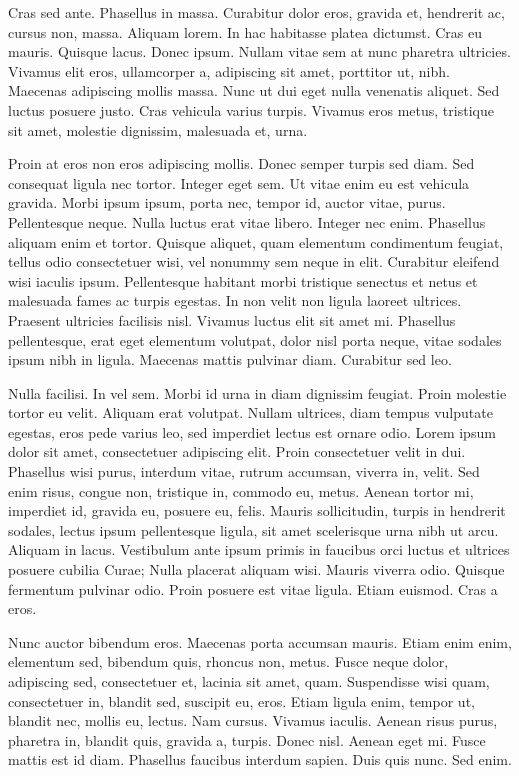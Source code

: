 Cras sed ante. Phasellus in massa. Curabitur dolor eros, gravida et, hendrerit ac, cursus non, massa. Aliquam lorem. In hac habitasse platea dictumst. Cras eu mauris. Quisque lacus. Donec ipsum. Nullam vitae sem at nunc pharetra ultricies. Vivamus elit eros, ullamcorper a, adipiscing sit amet, porttitor ut, nibh. Maecenas adipiscing mollis massa. Nunc ut dui eget nulla venenatis aliquet. Sed luctus posuere justo. Cras vehicula varius turpis. Vivamus eros metus, tristique sit amet, molestie dignissim, malesuada et, urna.

Proin at eros non eros adipiscing mollis. Donec semper turpis sed diam. Sed consequat ligula nec tortor. Integer eget sem. Ut vitae enim eu est vehicula gravida. Morbi ipsum ipsum, porta nec, tempor id, auctor vitae, purus. Pellentesque neque. Nulla luctus erat vitae libero. Integer nec enim. Phasellus aliquam enim et tortor. Quisque aliquet, quam elementum condimentum feugiat, tellus odio consectetuer wisi, vel nonummy sem neque in elit. Curabitur eleifend wisi iaculis ipsum. Pellentesque habitant morbi tristique senectus et netus et malesuada fames ac turpis egestas. In non velit non ligula laoreet ultrices. Praesent ultricies facilisis nisl. Vivamus luctus elit sit amet mi. Phasellus pellentesque, erat eget elementum volutpat, dolor nisl porta neque, vitae sodales ipsum nibh in ligula. Maecenas mattis pulvinar diam. Curabitur sed leo.

Nulla facilisi. In vel sem. Morbi id urna in diam dignissim feugiat. Proin molestie tortor eu velit. Aliquam erat volutpat. Nullam ultrices, diam tempus vulputate egestas, eros pede varius leo, sed imperdiet lectus est ornare odio. Lorem ipsum dolor sit amet, consectetuer adipiscing elit. Proin consectetuer velit in dui. Phasellus wisi purus, interdum vitae, rutrum accumsan, viverra in, velit. Sed enim risus, congue non, tristique in, commodo eu, metus. Aenean tortor mi, imperdiet id, gravida eu, posuere eu, felis. Mauris sollicitudin, turpis in hendrerit sodales, lectus ipsum pellentesque ligula, sit amet scelerisque urna nibh ut arcu. Aliquam in lacus. Vestibulum ante ipsum primis in faucibus orci luctus et ultrices posuere cubilia Curae; Nulla placerat aliquam wisi. Mauris viverra odio. Quisque fermentum pulvinar odio. Proin posuere est vitae ligula. Etiam euismod. Cras a eros.

Nunc auctor bibendum eros. Maecenas porta accumsan mauris. Etiam enim enim, elementum sed, bibendum quis, rhoncus non, metus. Fusce neque dolor, adipiscing sed, consectetuer et, lacinia sit amet, quam. Suspendisse wisi quam, consectetuer in, blandit sed, suscipit eu, eros. Etiam ligula enim, tempor ut, blandit nec, mollis eu, lectus. Nam cursus. Vivamus iaculis. Aenean risus purus, pharetra in, blandit quis, gravida a, turpis. Donec nisl. Aenean eget mi. Fusce mattis est id diam. Phasellus faucibus interdum sapien. Duis quis nunc. Sed enim.

